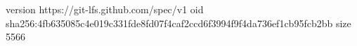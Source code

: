 version https://git-lfs.github.com/spec/v1
oid sha256:4fb635085c4e019c331fde8fd07f4caf2ccd6f3994f9f4da736ef1cb95fcb2bb
size 5566
